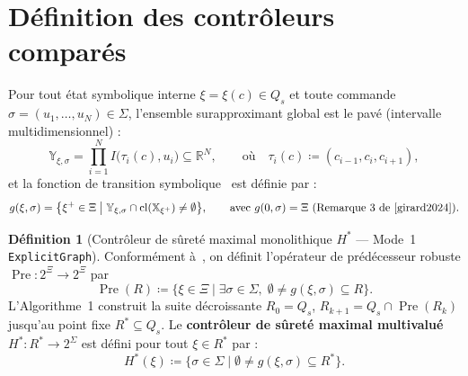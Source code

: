 \documentclass[11pt,a4paper]{article}
\theoremstyle{definition}
\newtheorem{definition}{Définition}
\theoremstyle{plain}
\newcommand{\R}{\mathbb{R}}
\newcommand{\X}{\mathbb{X}}
\newcommand{\Pre}{\operatorname{Pre}}
\newcommand{\cl}{\operatorname{cl}}
\newcommand{\code}[1]{\texttt{#1}}
\begin{document}
\section{Définition des contrôleurs comparés}

Pour tout état symbolique interne $\xi = \xi(c) \in Q_s$ et toute commande $\sigma = (u_1, \dots, u_N) \in \Sigma$, l'ensemble surapproximant global est le pavé (intervalle multidimensionnel) :
\begin{equation}
  \mathbb{Y}_{\xi, \sigma} = \prod_{i=1}^{N} I\bigl(\tau_i(c), u_i\bigr) \subseteq \R^N,
  \qquad\text{où}\quad \tau_i(c) \coloneqq (c_{i-1}, c_i, c_{i+1}),
  \label{eq:global_box}
\end{equation}
et la fonction de transition symbolique~\cite[§1.1.2]{girard2024} est définie par :
\begin{equation}
  g(\xi, \sigma) = \bigl\{\xi^+ \in \Xi \;\big|\; \mathbb{Y}_{\xi, \sigma} \cap \cl(\X_{\xi^+}) \neq \emptyset\bigr\},
  \qquad\text{avec } g(0, \sigma) = \Xi \text{ (Remarque~3 de~\cite{girard2024}).}
  \label{eq:symbolic_trans}
\end{equation}

\begin{definition}[Contrôleur de sûreté maximal monolithique $H^*$ --- Mode~1 \code{ExplicitGraph}]
\label{def:h_star}
Conformément à~\cite[§2.1, Éq.~(8), Algorithme~1 et Théorème~2]{girard2024}, on définit l'opérateur de prédécesseur robuste $\Pre : 2^\Xi \to 2^\Xi$ par
\[
  \Pre(R) \coloneqq \bigl\{\xi \in \Xi \;\big|\; \exists \sigma \in \Sigma,\; \emptyset \neq g(\xi, \sigma) \subseteq R\bigr\}.
\]
L'Algorithme~1 construit la suite décroissante $R_0 = Q_s$, $R_{k+1} = Q_s \cap \Pre(R_k)$ jusqu'au point fixe $R^* \subseteq Q_s$. Le \textbf{contrôleur de sûreté maximal multivalué} $H^* : R^* \to 2^\Sigma$ est défini pour tout $\xi \in R^*$ par :
\begin{equation}
  H^*(\xi) \coloneqq \bigl\{\sigma \in \Sigma \;\big|\; \emptyset \neq g(\xi, \sigma) \subseteq R^*\bigr\}.
  \label{eq:h_star}
\end{equation}
\end{definition}
\end{document}
